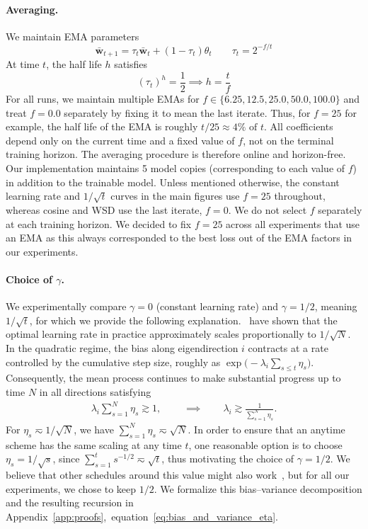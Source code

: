\documentclass{article}
\def\bw{\bar{\mathbf{w}}}
\def\eqref#1{equation~\ref{#1}}
\def\bw{\bar{\mathbf{w}}}
\theoremstyle{plain}
\def\bw{\bar{\mathbf{w}}}
\begin{document}
\paragraph{Averaging.} We maintain EMA parameters 
\[
\bw_{t+1} = \tau_t \bw_{t} + (1-\tau_t) \theta_t \qquad \tau_t = 2^{-f/t}
\] 
At time $t$, the half life $h$ satisfies 
\[
(\tau_t)^h = \frac{1}{2} \implies h = \frac{t}{f}
\]
For all runs, we maintain multiple EMAs for $f \in \{6.25, 12.5, 25.0, 50.0, 100.0\}$ and treat $f=0.0$ separately by fixing it to mean the last iterate. Thus, for $f=25$ for example, the half life of the EMA is roughly $t/25 \approx 4\% \text{ of } t$. All coefficients depend only on the current time and a fixed value of \(f\), not on the terminal training horizon. The averaging procedure is therefore online and horizon-free. Our implementation maintains 5 model copies (corresponding to each value of $f$) in addition to the trainable model. Unless mentioned otherwise, the constant learning rate and $1/\sqrt{t}$ curves in the main figures use \(f=25\) throughout, whereas cosine and WSD use the last iterate, \(f=0\). We do not select \(f\) separately at each training horizon. 
We decided to fix $f=25$ across all experiments that use an EMA as this always corresponded to the best loss out of the EMA factors in our experiments.
\paragraph{Choice of $\gamma$.} We experimentally compare $\gamma = 0$ (constant learning rate) and $\gamma=1/2$, meaning $1/\sqrt{t}$, for which we provide the following explanation.~\citet{mlodozeniec2025completed, bjorck2024scaling} have shown that the optimal learning rate in practice approximately scales proportionally to $1/\sqrt{N}$. In the quadratic regime, the bias along eigendirection $i$ contracts at a rate controlled by the cumulative step size, roughly as $\exp\big(-\lambda_i \sum_{s\le t}\eta_s\big)$. Consequently, the mean process continues to make substantial progress up to time $N$ in all directions satisfying
\begin{align*}
    \lambda_i \sum_{s=1}^N \eta_s \gtrsim 1,
    \qquad\ \implies \qquad
    \lambda_i \gtrsim \frac{1}{\sum_{s=1}^N \eta_s}.
\end{align*}
For $\eta_s \eqsim 1/\sqrt{N}$, we have $\sum_{s=1}^N \eta_s \eqsim \sqrt{N}$. In order to ensure that an anytime scheme has the same scaling at any time $t$, one reasonable option is to choose $\eta_s = 1/\sqrt{s}$, since $\sum_{s=1}^t s^{-1/2} \eqsim \sqrt{t}$, thus motivating the choice of $\gamma=1/2$. We believe that other schedules around this value might also work~\citep{bjorck2024scaling,shuai2024scaling}, but for all our experiments, we chose to keep $1/2$. We formalize this bias--variance decomposition and the resulting recursion in Appendix~\ref{app:proofs},~\eqref{eq:bias_and_variance_eta}.
\end{document}
